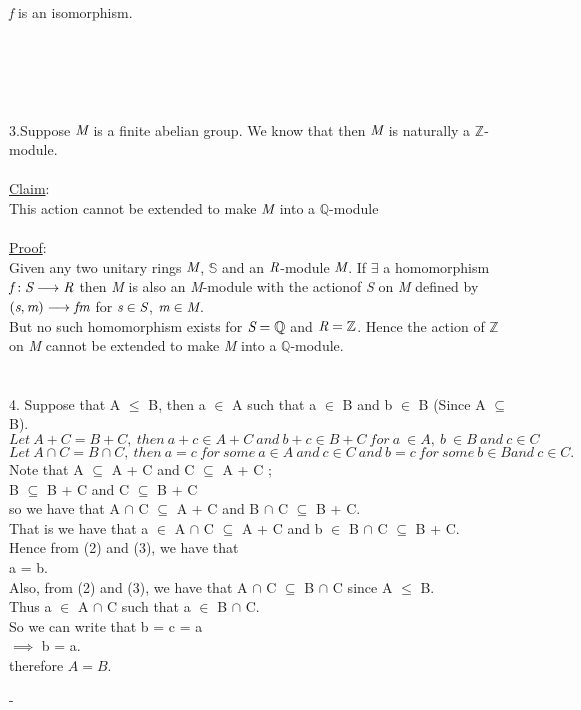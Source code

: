 \documentclass{article}
\begin{document}
\emph{f} is an isomorphism.
\\
\\
\\
\\
\\
\\
3.Suppose $\emph{M}$ is a finite abelian group. We know that then $\emph{M}$ 
is naturally a $\mathbb{Z}$-module.\\
\\
\underline{Claim}:\\
This action cannot be extended to make $\emph{M}$ into a $\mathbb{Q}$-module
\\
\\
\underline{Proof}:\\
Given any two unitary rings $\emph{M}$, $\mathbb{S}$ and an $\emph{R}$-module $\emph{M}$. If $\exists$
 a homomorphism $\emph{f}: \emph{S}\longrightarrow\emph{R}$ then \emph{M} is also an 
\emph{M}-module with the actionof \emph{S} on \emph{M} defined by 
$(\emph{s}, \emph{m})\longrightarrow\emph{f}\emph{m}$
for $\emph{s}\in\emph{S}$, $\emph{m}\in\emph{M}$.\\
But no such homomorphism exists for $\emph{S} = \mathbb{Q}$ and $\emph{R} = \mathbb{Z}$. 
Hence the action of $\mathbb{Z}$ on \emph{M} 
cannot be extended to make \emph{M} into a $\mathbb{Q}$-module.\\
\\
\\

4. Suppose that A $\le$ B, then a $\in$ A such that a $\in$ B and b $\in$ B (Since A $\subseteq$ B).\\
\begin{equation}
  Let\ A + C = B + C,\ then\ a + c \in A + C\ and\ b + c \in B + C\ for\ a\ \in A,\ b\ \in B\ and\ c \in C
\end{equation}
\begin{equation}Let\ A \cap C = B \cap C,\ then\ a = c\ for\ some\ a \in A\ and\ c \in C\ and\ b = c\ for\ some\ b \in B and\ c \in C.
\end{equation}
Note that A $\subseteq$ A + C and C $\subseteq$ A + C  ;\\B $\subseteq$ B + C and C $\subseteq$ B + C\\
so we have that A $\cap$ C $\subseteq$ A + C and B $\cap$ C $\subseteq$ B + C.\\
That is we have that a $\in$ A $\cap$ C $\subseteq$ A + C and b $\in$ B $\cap$ C $\subseteq$ B + C.\\
Hence from (2) and (3), we have that \\ 
a = b.\\
Also, from (2) and (3), we have that A $\cap$ C $\subseteq$ B $\cap$ C since A $\le$ B.\\ 
Thus a $\in$ A $\cap$ C such that a $\in$ B $\cap$ C.\\
So we can write that b = c = a\\
$\implies$ b = a.\\
therefore $A = B$.


-
\end{document}
